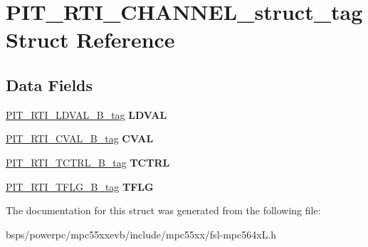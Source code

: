 \hypertarget{structPIT__RTI__CHANNEL__struct__tag}{}\section{P\+I\+T\+\_\+\+R\+T\+I\+\_\+\+C\+H\+A\+N\+N\+E\+L\+\_\+struct\+\_\+tag Struct Reference}
\label{structPIT__RTI__CHANNEL__struct__tag}
\subsection*{Data Fields}
\begin{DoxyCompactItemize}
\item 
\mbox{\label{structPIT__RTI__CHANNEL__struct__tag_a0daaac641ec050c0573d286aa2d5c40e}} 
\mbox{\hyperlink{unionPIT__RTI__LDVAL__32B__tag}{P\+I\+T\+\_\+\+R\+T\+I\+\_\+\+L\+D\+V\+A\+L\+\_\+B\+\_\+tag}} {\bfseries L\+D\+V\+AL}
\item 
\mbox{\label{structPIT__RTI__CHANNEL__struct__tag_a498a551b9b5d696a6dd38cbb73bc8221}} 
\mbox{\hyperlink{unionPIT__RTI__CVAL__32B__tag}{P\+I\+T\+\_\+\+R\+T\+I\+\_\+\+C\+V\+A\+L\+\_\+B\+\_\+tag}} {\bfseries C\+V\+AL}
\item 
\mbox{\label{structPIT__RTI__CHANNEL__struct__tag_a2db0e9c0d32629fa9cb8bd320b86abbc}} 
\mbox{\hyperlink{unionPIT__RTI__TCTRL__32B__tag}{P\+I\+T\+\_\+\+R\+T\+I\+\_\+\+T\+C\+T\+R\+L\+\_\+B\+\_\+tag}} {\bfseries T\+C\+T\+RL}
\item 
\mbox{\label{structPIT__RTI__CHANNEL__struct__tag_a0fa38bfb5a1649b691ea2ffa10315baa}} 
\mbox{\hyperlink{unionPIT__RTI__TFLG__32B__tag}{P\+I\+T\+\_\+\+R\+T\+I\+\_\+\+T\+F\+L\+G\+\_\+B\+\_\+tag}} {\bfseries T\+F\+LG}
\end{DoxyCompactItemize}


The documentation for this struct was generated from the following file\+:\begin{DoxyCompactItemize}
\item 
bsps/powerpc/mpc55xxevb/include/mpc55xx/fsl-\/mpc564x\+L.\+h\end{DoxyCompactItemize}
